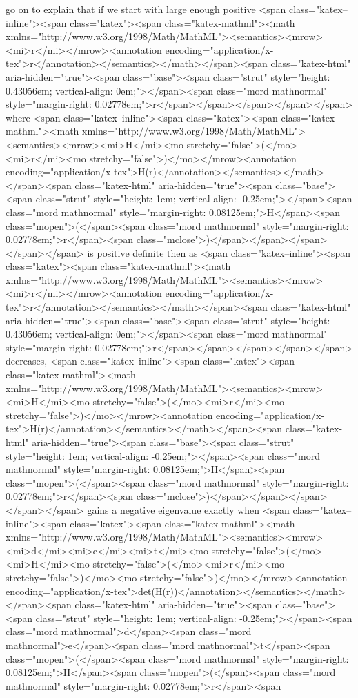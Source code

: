 \cite{SaadeBethe} go on to explain that if we start with large enough positive <span class="katex--inline"><span class="katex"><span class="katex-mathml"><math xmlns="http://www.w3.org/1998/Math/MathML"><semantics><mrow><mi>r</mi></mrow><annotation encoding="application/x-tex">r</annotation></semantics></math></span><span class="katex-html" aria-hidden="true"><span class="base"><span class="strut" style="height: 0.43056em; vertical-align: 0em;"></span><span class="mord mathnormal" style="margin-right: 0.02778em;">r</span></span></span></span></span> where <span class="katex--inline"><span class="katex"><span class="katex-mathml"><math xmlns="http://www.w3.org/1998/Math/MathML"><semantics><mrow><mi>H</mi><mo stretchy="false">(</mo><mi>r</mi><mo stretchy="false">)</mo></mrow><annotation encoding="application/x-tex">H(r)</annotation></semantics></math></span><span class="katex-html" aria-hidden="true"><span class="base"><span class="strut" style="height: 1em; vertical-align: -0.25em;"></span><span class="mord mathnormal" style="margin-right: 0.08125em;">H</span><span class="mopen">(</span><span class="mord mathnormal" style="margin-right: 0.02778em;">r</span><span class="mclose">)</span></span></span></span></span> is positive definite then as <span class="katex--inline"><span class="katex"><span class="katex-mathml"><math xmlns="http://www.w3.org/1998/Math/MathML"><semantics><mrow><mi>r</mi></mrow><annotation encoding="application/x-tex">r</annotation></semantics></math></span><span class="katex-html" aria-hidden="true"><span class="base"><span class="strut" style="height: 0.43056em; vertical-align: 0em;"></span><span class="mord mathnormal" style="margin-right: 0.02778em;">r</span></span></span></span></span> decreases, <span class="katex--inline"><span class="katex"><span class="katex-mathml"><math xmlns="http://www.w3.org/1998/Math/MathML"><semantics><mrow><mi>H</mi><mo stretchy="false">(</mo><mi>r</mi><mo stretchy="false">)</mo></mrow><annotation encoding="application/x-tex">H(r)</annotation></semantics></math></span><span class="katex-html" aria-hidden="true"><span class="base"><span class="strut" style="height: 1em; vertical-align: -0.25em;"></span><span class="mord mathnormal" style="margin-right: 0.08125em;">H</span><span class="mopen">(</span><span class="mord mathnormal" style="margin-right: 0.02778em;">r</span><span class="mclose">)</span></span></span></span></span> gains a negative eigenvalue exactly when <span class="katex--inline"><span class="katex"><span class="katex-mathml"><math xmlns="http://www.w3.org/1998/Math/MathML"><semantics><mrow><mi>d</mi><mi>e</mi><mi>t</mi><mo stretchy="false">(</mo><mi>H</mi><mo stretchy="false">(</mo><mi>r</mi><mo stretchy="false">)</mo><mo stretchy="false">)</mo></mrow><annotation encoding="application/x-tex">det(H(r))</annotation></semantics></math></span><span class="katex-html" aria-hidden="true"><span class="base"><span class="strut" style="height: 1em; vertical-align: -0.25em;"></span><span class="mord mathnormal">d</span><span class="mord mathnormal">e</span><span class="mord mathnormal">t</span><span class="mopen">(</span><span class="mord mathnormal" style="margin-right: 0.08125em;">H</span><span class="mopen">(</span><span class="mord mathnormal" style="margin-right: 0.02778em;">r</span><span 